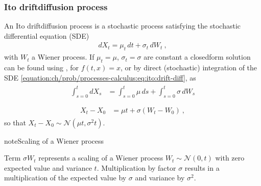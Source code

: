 \documentclass[letterpaper,10pt,english]{jupyterBook}
\begin{document}
\subsubsection{Ito drift\sphinxhyphen{}diffusion process}
\label{\detokenize{ch/prob/processes-calculus:ito-drift-diffusion-process}}\label{\detokenize{ch/prob/processes-calculus:prob-processes-calculus-ito-process-drift-diffusion}}
\sphinxAtStartPar
An Ito drift\sphinxhyphen{}diffusion process is a stochastic process satisfying the stochastic differential equation (SDE)
\begin{equation}\label{equation:ch/prob/processes-calculus:eq:ito:drift-diff}
\begin{split}dX_t = \mu_t \, dt + \sigma_t \, dW_t \ ,\end{split}
\end{equation}
\sphinxAtStartPar
with \(W_t\) a Wiener process. If \(\mu_t = \mu\), \(\sigma_t = \sigma\) are constant a closed\sphinxhyphen{}form solution can be found using {\hyperref[\detokenize{ch/prob/processes-calculus:prob-processes-calculus-ito-lemma}]{}}, for \(f(t,x) = x\), or by direct (stochastic) integration of the SDE \eqref{equation:ch/prob/processes-calculus:eq:ito:drift-diff}, as
\begin{equation*}
\begin{split}\begin{aligned}
  \int_{s=0}^t dX_s & = \int_{s=0}^t \mu \, ds + \int_{s=0}^t \sigma \, dW_s \\
\end{aligned}\end{split}
\end{equation*}\begin{equation*}
\begin{split}\begin{aligned}
  X_t - X_0 & = \mu t + \sigma \left( W_t - W_0 \right) \ ,
\end{aligned}\end{split}
\end{equation*}
\sphinxAtStartPar
so that \(X_t - X_0 \sim \mathscr{N}\left( \mu t, \sigma^2 t \right)\).

\begin{sphinxadmonition}{note}{Scaling of a Wiener process}

\sphinxAtStartPar
Term \(\sigma W_t\) represents a scaling of a Wiener process \(W_t \sim \mathscr{N}(0, t)\) with zero expected value and variance \(t\). Multiplication by factor \(\sigma\) results in a multiplication of the expected value by \(\sigma\) and variance by \(\sigma^2\).
\end{sphinxadmonition}
\end{document}
